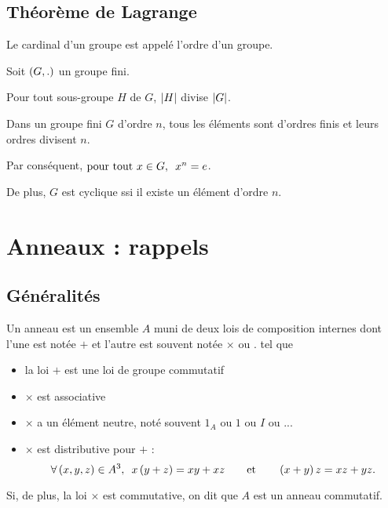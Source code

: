 \subsection{Théorème de Lagrange}

\begin{defi}
Le cardinal d'un groupe est appelé l'ordre d'un groupe.
\end{defi}

\begin{theo}
Soit \(\groupe{G}[.]\) un groupe fini.

Pour tout sous-groupe \(H\) de \(G\), \(\left\lvert H\right\rvert\) divise \(\left\lvert G\right\rvert\).
\end{theo}

\begin{cor}
Dans un groupe fini \(G\) d'ordre \(n\), tous les éléments sont d'ordres finis et leurs ordres divisent \(n\).

Par conséquent, \(\quantifs{\tpt x\in G}x^n=e\).

De plus, \(G\) est cyclique ssi il existe un élément d'ordre \(n\).
\end{cor}

\section{Anneaux : rappels}

\subsection{Généralités}

\begin{defi}
Un anneau est un ensemble \(A\) muni de deux lois de composition internes dont l'une est notée \(+\) et l'autre est souvent notée \(\times\) ou \(.\) tel que

\begin{itemize}
    \item la loi \(+\) est une loi de groupe commutatif \\
    \item \(\times\) est associative \\
    \item \(\times\) a un élément neutre, noté souvent \(1_A\) ou \(1\) ou \(I\) ou ... \\
    \item \(\times\) est distributive pour \(+\) : \[\quantifs{\forall\paren{x,y,z}\in A^3}x\paren{y+z}=xy+xz\qquad\text{et}\qquad\paren{x+y}z=xz+yz.\]
\end{itemize}

Si, de plus, la loi \(\times\) est commutative, on dit que \(A\) est un anneau commutatif.
\end{defi}


